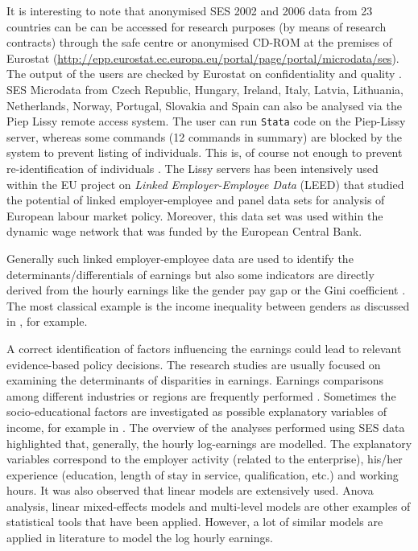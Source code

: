 \documentclass[12pt]{article}
\begin{document}
It is interesting to note that anonymised SES 2002 and 2006 data \citep{ses2} from 23 countries can be can be
accessed for research purposes (by means of research contracts) through the safe
centre or anonymised CD-ROM at the premises of Eurostat 
(\href{http://epp.eurostat.ec.europa.eu/portal/page/portal/microdata/ses}{http://epp.eurostat.ec.europa.eu/portal/page/portal/microdata/ses}). 
The output of the users are 
 checked by Eurostat on confidentiality and quality \citep{ses1}.\\
SES Microdata from Czech Republic, Hungary, Ireland,
Italy, Latvia, Lithuania, Netherlands, Norway, Portugal, Slovakia and Spain can also be
analysed via the Piep Lissy remote access system. The user can run 
\texttt{Stata} code on the Piep-Lissy server, whereas some commands
(12 commands in summary) are blocked by the system to prevent listing of individuals. This is, of course not enough to prevent 
re-identification of individuals \citep[see, e.g.,][]{templ11ses}.
The Lissy servers has been intensively used within the EU project on \textit{Linked Employer-Employee Data} (LEED)  that 
studied the potential of linked employer-employee and panel data sets 
for analysis of European labour market policy. Moreover, this data set was used within 
the dynamic wage network that was funded by the European Central Bank. 

Generally such linked employer-employee data are used to identify
the determinants/differentials of earnings but also some indicators are
directly derived from the hourly earnings like the gender pay gap or the Gini coefficient
\citep{gini12}. The most classical example is the income inequality between genders as 
discussed in \cite{groshen91}, for example. 

A correct identification of factors influencing the earnings
could lead to relevant evidence-based policy decisions. 
The research studies are usually focused on examining the determinants of
disparities in earnings. 
Earnings comparisons among different industries or regions are frequently
performed  \citep[see,
e.g.,][]{stephan05,caju11,caju09,caju09b,messina10,dybczak10,simon10,pointner10}.
Sometimes the socio-educational factors are investigated as possible explanatory
variables of income, for example in \cite{bowles01}. 
The overview of the analyses performed using SES data highlighted that, generally, the hourly
log-earnings are modelled. The explanatory variables correspond to the
employer activity (related to the enterprise), 
his/her experience (education, length of stay in service, qualification, etc.)
and working hours. It was also observed that
linear models are extensively used. Anova analysis, linear mixed-effects models
and multi-level models are other examples of statistical tools that have been
applied. However, a lot of similar models are applied in literature to model the 
log hourly earnings. 
\end{document}
